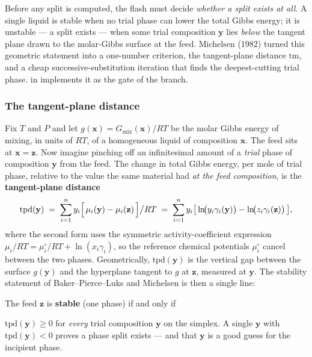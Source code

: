 \documentclass[11pt,a4paper]{article}
\newcommand{\xv}{\mathbf{x}}
\newcommand{\yv}{\mathbf{y}}
\newcommand{\zv}{\mathbf{z}}
\begin{document}
\begin{whatyoulllearn}
Before any split is computed, the flash must decide \emph{whether a
split exists at all}.  A single liquid is stable when no trial phase
can lower the total Gibbs energy; it is unstable --- a split exists ---
when some trial composition $\yv$ lies \emph{below} the tangent plane
drawn to the molar-Gibbs surface at the feed.  Michelsen (1982) turned
this geometric statement into a one-number criterion, the tangent-plane
distance $\mathrm{tm}$, and a cheap successive-substitution iteration
that finds the deepest-cutting trial phase.   in
 implements it as the gate of the
 branch.
\end{whatyoulllearn}

\subsubsection*{The tangent-plane distance}

Fix $T$ and $P$ and let $g(\xv) = G_{\mathrm{mix}}(\xv)/RT$ be the molar
Gibbs energy of mixing, in units of $RT$, of a homogeneous liquid of
composition $\xv$.  The feed sits at $\xv = \zv$.  Now imagine pinching
off an infinitesimal amount of a \emph{trial} phase of composition
$\yv$ from the feed.  The change in total Gibbs energy, per mole of
trial phase, relative to the value the same material had \emph{at the
feed composition}, is the \textbf{tangent-plane distance}
\begin{equation}
  \mathrm{tpd}(\yv)
    \;=\; \sum_{i=1}^{n} y_i
          \Bigl[\, \mu_i(\yv) - \mu_i(\zv) \,\Bigr] \big/ RT
    \;=\; \sum_{i=1}^{n} y_i
          \bigl[\, \ln\!\bigl(y_i\gamma_i(\yv)\bigr)
                  - \ln\!\bigl(z_i\gamma_i(\zv)\bigr) \,\bigr],
  \label{eq:tpd-def}
\end{equation}
where the second form uses the symmetric activity-coefficient
expression $\mu_i/RT = \mu_i^\circ/RT + \ln(x_i\gamma_i)$, so the
reference chemical potentials $\mu_i^\circ$ cancel between the two
phases.  Geometrically, $\mathrm{tpd}(\yv)$ is the vertical gap between
the surface $g(\yv)$ and the hyperplane tangent to $g$ at $\zv$,
measured at $\yv$.  The stability statement of Baker--Pierce--Luks and
Michelsen is then a single line:
\begin{keyidea}
The feed $\zv$ is \textbf{stable} (one phase) if and only if


$\mathrm{tpd}(\yv) \ge 0$ for \emph{every} trial composition $\yv$ on
the simplex.  A single $\yv$ with $\mathrm{tpd}(\yv) < 0$ proves a
phase split exists --- and that $\yv$ is a good guess for the
incipient phase.
\end{keyidea}
\end{document}
